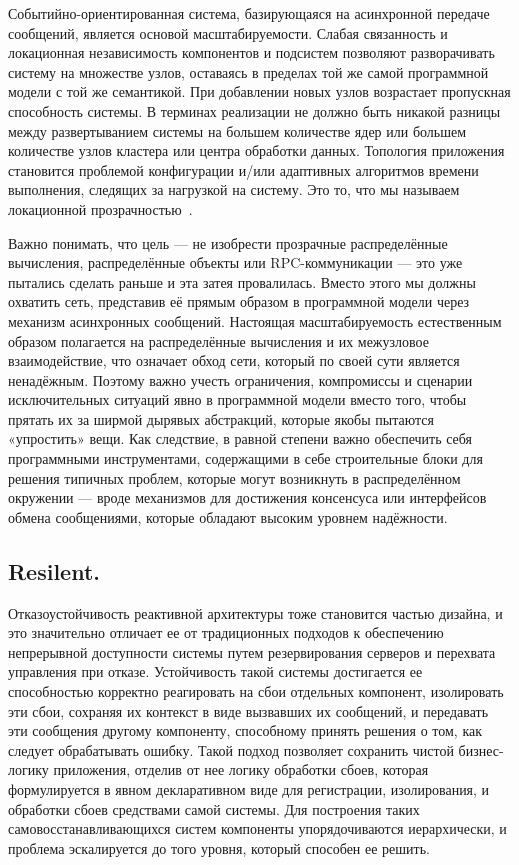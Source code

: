 Событийно-ориентированная система, базирующаяся на асинхронной передаче сообщений, является основой масштабируемости. Слабая связанность и локационная независимость компонентов и подсистем позволяют разворачивать систему на множестве узлов, оставаясь в пределах той же самой программной модели с той же семантикой. При добавлении новых узлов возрастает пропускная способность системы. В терминах реализации не должно быть никакой разницы между развертыванием системы на большем количестве ядер или большем количестве узлов кластера или центра обработки данных. Топология приложения становится проблемой конфигурации и/или адаптивных алгоритмов времени выполнения, следящих за нагрузкой на систему. Это то, что мы называем локационной прозрачностью~\cite{location_transparency}.

Важно понимать, что цель --- не изобрести прозрачные распределённые вычисления, распределённые объекты или RPC-коммуникации --- это уже пытались сделать раньше и эта затея провалилась. Вместо этого мы должны охватить сеть, представив её прямым образом в программной модели через механизм асинхронных сообщений. Настоящая масштабируемость естественным образом полагается на распределённые вычисления и их межузловое взаимодействие, что означает обход сети, который по своей сути является ненадёжным. Поэтому важно учесть ограничения, компромиссы и сценарии исключительных ситуаций явно в программной модели вместо того, чтобы прятать их за ширмой дырявых абстракций, которые якобы пытаются «упростить» вещи. Как следствие, в равной степени важно обеспечить себя программными инструментами, содержащими в себе строительные блоки для решения типичных проблем, которые могут возникнуть в распределённом окружении --- вроде механизмов для достижения консенсуса или интерфейсов обмена сообщениями, которые обладают высоким уровнем надёжности.

\subsection{Resilent. }
\label{subsub:domain:reactive_programming:resilent}

Отказоустойчивость реактивной архитектуры тоже становится частью дизайна, и это значительно отличает ее от традиционных подходов к обеспечению непрерывной доступности системы путем резервирования серверов и перехвата управления при отказе. Устойчивость такой системы достигается ее способностью корректно реагировать на сбои отдельных компонент, изолировать эти сбои, сохраняя их контекст в виде вызвавших их сообщений, и передавать эти сообщения другому компоненту, способному принять решения о том, как следует обрабатывать ошибку. Такой подход позволяет сохранить чистой бизнес-логику приложения, отделив от нее логику обработки сбоев, которая формулируется в явном декларативном виде для регистрации, изолирования, и обработки сбоев средствами самой системы. Для построения таких самовосстанавливающихся систем компоненты упорядочиваются иерархически, и проблема эскалируется до того уровня, который способен ее решить.

